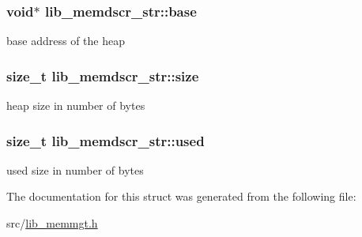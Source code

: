 \subsubsection[{base}]{\setlength{\rightskip}{0pt plus 5cm}void$\ast$ lib\+\_\+memdscr\+\_\+str\+::base}\label{structlib__memdscr__str_a95021f2dac50fa28470ebcd4c9c8b14c}
base address of the heap \hypertarget{structlib__memdscr__str_a34437a2f1655d8adaedb8b6f99baf5d1}{}
\subsubsection[{size}]{\setlength{\rightskip}{0pt plus 5cm}size\+\_\+t lib\+\_\+memdscr\+\_\+str\+::size}\label{structlib__memdscr__str_a34437a2f1655d8adaedb8b6f99baf5d1}
heap size in number of bytes \hypertarget{structlib__memdscr__str_adf173931ba35fc1b2fa93b8911e2ca09}{}
\subsubsection[{used}]{\setlength{\rightskip}{0pt plus 5cm}size\+\_\+t lib\+\_\+memdscr\+\_\+str\+::used}\label{structlib__memdscr__str_adf173931ba35fc1b2fa93b8911e2ca09}
used size in number of bytes 

The documentation for this struct was generated from the following file\+:\begin{DoxyCompactItemize}
\item 
src/\hyperlink{lib__memmgt_8h}{lib\+\_\+memmgt.\+h}\end{DoxyCompactItemize}
